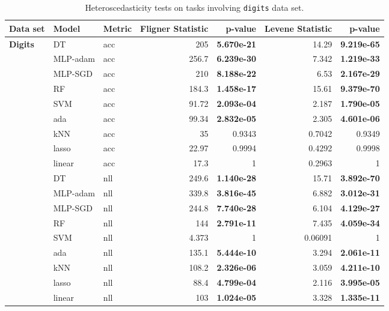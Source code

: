 \documentclass[jair,twoside,11pt,theapa]{article}
\theoremstyle{definition}
\begin{document}
\begin{table*}
\centering
\caption{Heteroscedasticity tests on tasks involving \texttt{digits} data set.}
\label{tab:search-spacehetero-tests-digits}
\begin{tabular}{lllrrrr}
\toprule
Data set & Model & Metric & Fligner Statistic & p-value & Levene Statistic & p-value \\ 
\midrule
\textbf{Digits} & DT & acc & 205 & \textbf{5.670e-21} & 14.29 & \textbf{9.219e-65} \\ 
  & MLP-adam & acc & 256.7 & \textbf{6.239e-30} & 7.342 & \textbf{1.219e-33} \\ 
  & MLP-SGD & acc & 210 & \textbf{8.188e-22} & 6.53 & \textbf{2.167e-29} \\ 
  & RF & acc & 184.3 & \textbf{1.458e-17} & 15.61 & \textbf{9.379e-70} \\ 
  & SVM & acc & 91.72 & \textbf{2.093e-04} & 2.187 & \textbf{1.790e-05} \\ 
  & ada & acc & 99.34 & \textbf{2.832e-05} & 2.305 & \textbf{4.601e-06} \\ 
  & kNN & acc & 35 & 0.9343 & 0.7042 & 0.9349 \\ 
  & lasso & acc & 22.97 & 0.9994 & 0.4292 & 0.9998 \\ 
  & linear & acc & 17.3 & 1 & 0.2963 & 1 \\ 
  & DT & nll & 249.6 & \textbf{1.140e-28} & 15.71 & \textbf{3.892e-70} \\ 
  & MLP-adam & nll & 339.8 & \textbf{3.816e-45} & 6.882 & \textbf{3.012e-31} \\ 
  & MLP-SGD & nll & 244.8 & \textbf{7.740e-28} & 6.104 & \textbf{4.129e-27} \\ 
  & RF & nll & 144 & \textbf{2.791e-11} & 7.435 & \textbf{4.059e-34} \\ 
  & SVM & nll & 4.373 & 1 & 0.06091 & 1 \\ 
  & ada & nll & 135.1 & \textbf{5.444e-10} & 3.294 & \textbf{2.061e-11} \\ 
  & kNN & nll & 108.2 & \textbf{2.326e-06} & 3.059 & \textbf{4.211e-10} \\ 
  & lasso & nll & 88.4 & \textbf{4.799e-04} & 2.116 & \textbf{3.995e-05} \\ 
  & linear & nll & 103 & \textbf{1.024e-05} & 3.328 & \textbf{1.335e-11} \\ 
\bottomrule
\end{tabular}
\end{table*}
\end{document}
